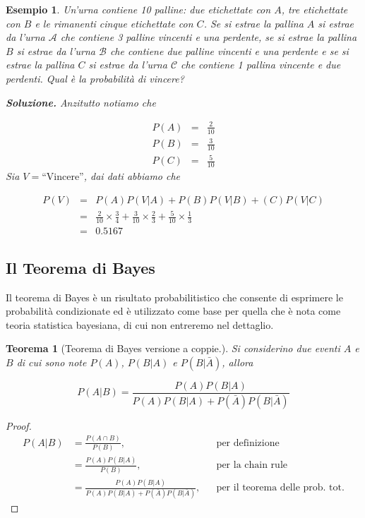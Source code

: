 \documentclass[
  11pt,
]{book}
\theoremstyle{mytheoremstyle}
\newtheorem{theorem}{Teorema}[section]
\theoremstyle{mydefstyle}
\newtheorem{example}{{Esempio}}[section]
\begin{document}
\begin{example}
Un'urna contiene 10 palline: due etichettate con \(A\), tre etichettate
con \(B\) e le rimanenti cinque etichettate con \(C\). Se si estrae la
pallina \(A\) si estrae da l'urna \(\mathcal{A}\) che contiene 3 palline
vincenti e una perdente, se si estrae la pallina \(B\) si estrae da l'urna
\(\mathcal{B}\) che contiene due palline vincenti e una perdente e se si
estrae la pallina \(C\) si estrae da l'urna \(\mathcal{C}\) che contiene 1
pallina vincente e due perdenti. Qual è la probabilità di vincere?

\textbf{Soluzione.} Anzitutto notiamo che

\begin{eqnarray*}
P(A)&=&\frac 2{10}\\
P(B)&=&\frac 3{10}\\
P(C)&=&\frac 5{10}
\end{eqnarray*} Sia \(V=\text{“Vincere''}\), dai dati abbiamo che

\begin{eqnarray*}
P(V)&=&P(A)P(V|A)+P(B)P(V| B)+(C)P(V| C)\\
&=& \frac 2{10} \times \frac 34 + \frac 3{10} \times \frac 23 + \frac 5{10} \times \frac 13\\
&=& 0.5167
\end{eqnarray*}
\end{example}

\subsection{Il Teorema di Bayes}\label{il-teorema-di-bayes}

Il teorema di Bayes è un risultato probabilitistico che consente di
esprimere le probabilità condizionate ed è utilizzato come base per
quella che è nota come teoria statistica bayesiana, di cui non entreremo
nel dettaglio.

\begin{info}

\begin{theorem}[Teorema di Bayes versione a coppie.]
Si considerino due eventi \(A\) e \(B\) di cui sono note \(P(A)\), \(P(B|A)\) e
\(P(B|\bar A)\), allora

\[
P(A|B)=\frac{P(A)P(B|A)}{P(A)P(B|A)+P(\bar A)P(B|\bar A)}
\]
\end{theorem}

\end{info}

\begin{proof}
\begin{align*}
P(A|B)&=\frac{P(A\cap B)}{P(B)}, &&\text{per definizione}\\
&= \frac{P(A)P(B|A)}{P(B)},&& \text{per la chain rule}\\
&= \frac{P(A)P(B|A)}{P(A)P(B|A)+P(\bar A)P(B|\bar A)},&& \text{per il teorema delle prob. tot.}
\end{align*}
\end{proof}
\end{document}
